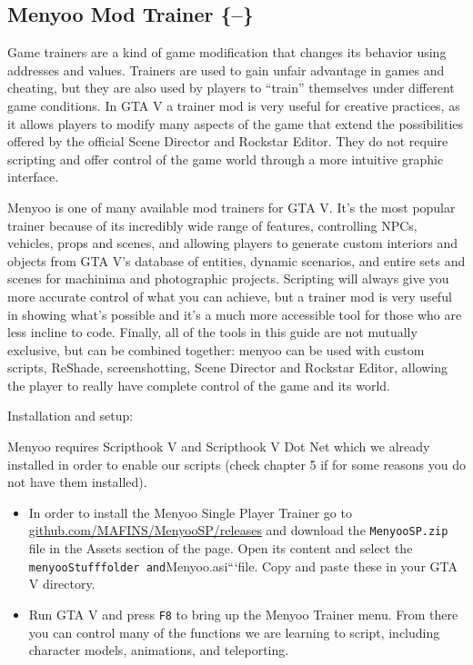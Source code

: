 \documentclass[
  openany]{book}
\begin{document}
\hypertarget{menyoo-mod-trainer}{%
\subsection{Menyoo Mod Trainer \{--\}}\label{menyoo-mod-trainer}}

Game trainers are a kind of game modification that changes its behavior using addresses and values. Trainers are used to gain unfair advantage in games and cheating, but they are also used by players to ``train'' themselves under different game conditions. In GTA V a trainer mod is very useful for creative practices, as it allows players to modify many aspects of the game that extend the possibilities offered by the official Scene Director and Rockstar Editor. They do not require scripting and offer control of the game world through a more intuitive graphic interface.

Menyoo is one of many available mod trainers for GTA V. It's the most popular trainer because of its incredibly wide range of features, controlling NPCs, vehicles, props and scenes, and allowing players to generate custom interiors and objects from GTA V's database of entities, dynamic scenarios, and entire sets and scenes for machinima and photographic projects. Scripting will always give you more accurate control of what you can achieve, but a trainer mod is very useful in showing what's possible and it's a much more accessible tool for those who are less incline to code. Finally, all of the tools in this guide are not mutually exclusive, but can be combined together: menyoo can be used with custom scripts, ReShade, screenshotting, Scene Director and Rockstar Editor, allowing the player to really have complete control of the game and its world.

Installation and setup:

Menyoo requires Scripthook V and Scripthook V Dot Net which we already installed in order to enable our scripts (check chapter 5 if for some reasons you do not have them installed).

\begin{itemize}
\item
  In order to install the Menyoo Single Player Trainer go to \href{https://github.com/MAFINS/MenyooSP/releases}{github.com/MAFINS/MenyooSP/releases} and download the \texttt{MenyooSP.zip} file in the Assets section of the page. Open its content and select the \texttt{menyooStuff\textasciigrave{}\textasciigrave{}folder\ and}Menyoo.asi```file. Copy and paste these in your GTA V directory.
\item
  Run GTA V and press \texttt{F8} to bring up the Menyoo Trainer menu. From there you can control many of the functions we are learning to script, including character models, animations, and teleporting.
\end{itemize}
\end{document}
